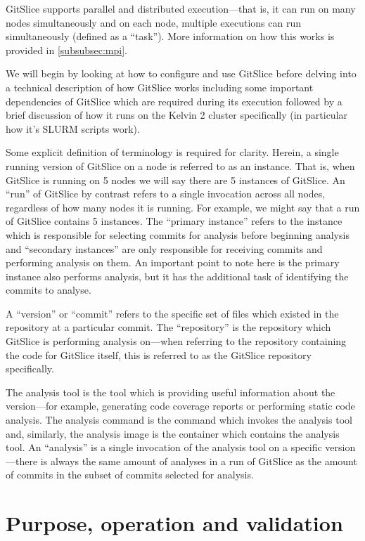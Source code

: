 \documentclass[11pt]{article}
\begin{document}
    GitSlice supports parallel and distributed execution---that is, it can run on many nodes simultaneously and on each node, multiple executions can run simultaneously (defined as a ``task'').
    More information on how this works is provided in \autoref{subsubsec:mpi}.
    
    We will begin by looking at how to configure and use GitSlice before delving into a technical description of how GitSlice works including some important dependencies of GitSlice which are required during its execution followed by a brief discussion of how it runs on the Kelvin 2 cluster specifically (in particular how it's SLURM scripts work).

    Some explicit definition of terminology is required for clarity.
    Herein, a single running version of GitSlice on a node is referred to as an instance.
    That is, when GitSlice is running on 5 nodes we will say there are 5 instances of GitSlice.
    An ``run'' of GitSlice by contrast refers to a single invocation across all nodes, regardless of how many nodes it is running.
    For example, we might say that a run of GitSlice contains 5 instances.
    The ``primary instance'' refers to the instance which is responsible for selecting commits for analysis before beginning analysis and ``secondary instances'' are only responsible for receiving commits and performing analysis on them.
    An important point to note here is the primary instance also performs analysis, but it has the additional task of identifying the commits to analyse.

    A ``version'' or ``commit'' refers to the specific set of files which existed in the repository at a particular commit.
    The ``repository'' is the repository which GitSlice is performing analysis on---when referring to the repository containing the code for GitSlice itself, this is referred to as the GitSlice repository specifically.

    The analysis tool is the tool which is providing useful information about the version---for example, generating code coverage reports or performing static code analysis.
    The analysis command is the command which invokes the analysis tool and, similarly, the analysis image is the container which contains the analysis tool.
    An ``analysis'' is a single invocation of the analysis tool on a specific version---there is always the same amount of analyses in a run of GitSlice as the amount of commits in the subset of commits selected for analysis.

    \section{Purpose, operation and validation}
    \label{sec:purpose-operation-and-validation}
\end{document}
